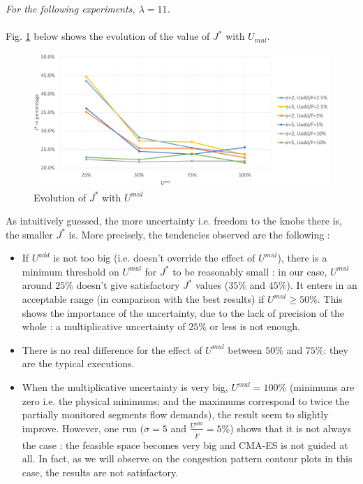 \emph{For the following experiments, $\lambda=11$.}\\
\\
Fig. \ref{fig:umulevolution} below shows the evolution of the value of $J^{*}$ with $U_{mul}$.
\begin{figure}[!h]
	\centering
	\caption{Evolution of $J^{*}$ with $U^{mul}$}
	\label{fig:umulevolution}
	\includegraphics[width=7in]{figures/umul.png}
\end{figure}
As intuitively guessed, the more uncertainty i.e. freedom to the knobs there is, the smaller $J^{*}$ is.
More precisely, the tendencies observed are the following :
\begin{itemize}
	\item If $U^{add}$ is not too big (i.e. doesn't override the effect of $U^{mul}$), there is a minimum threshold on $U^{mul}$ for $J^{*}$ to be reasonably small : in our case, $U^{mul}$ around $25\% $ doesn't give satisfactory $J^{*}$ values ($35\% $ and $45\% $). It enters in an acceptable range (in comparison with the best results) if $U^{mul}\geq 50\% $. This shows the importance of the uncertainty, due to the lack of precision of the whole : a multiplicative uncertainty of $25\% $ or less is not enough.
	\item There is no real difference for the effect of $U^{mul}$ between $50\% $ and $75\% $: they are the typical executions.
	\item When the multiplicative uncertainty is very big, $U^{mul}=100\% $ (minimums are zero i.e. the physical minimums; and the maximums correspond to twice the partially monitored segments flow demands), the result seem to slightly improve. However, one run ($\sigma=5$ and $\frac{U^{add}}{\widetilde{F}}=5\% $) shows that it is not always the case :  the feasible space becomes very big and CMA-ES is not guided at all. In fact, as we will observe on the congestion pattern contour plots in this case, the results are not satisfactory.
\end{itemize} 
